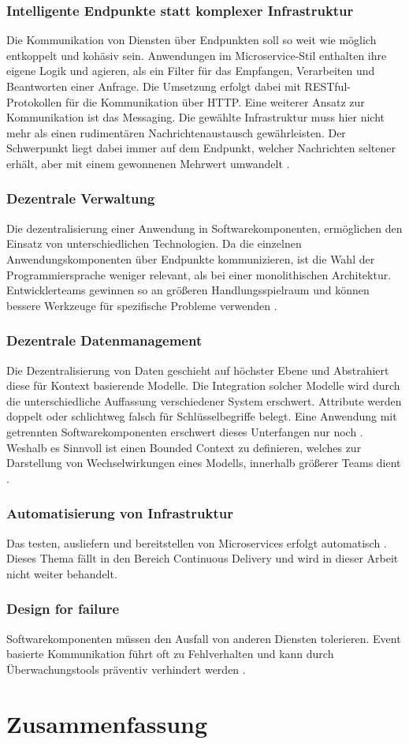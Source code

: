 \subsubsection{Intelligente Endpunkte statt komplexer Infrastruktur}
Die Kommunikation von Diensten über Endpunkten soll so weit wie möglich entkoppelt und kohäsiv sein.  
Anwendungen im Microservice-Stil enthalten ihre eigene Logik und agieren, als ein Filter für das Empfangen, Verarbeiten und Beantworten einer Anfrage. 
Die Umsetzung erfolgt dabei mit RESTful-Protokollen für die Kommunikation über HTTP. 
Eine weiterer Ansatz zur Kommunikation ist das Messaging.
Die gewählte Infrastruktur muss hier nicht mehr als einen rudimentären Nachrichtenaustausch gewährleisten. 
Der Schwerpunkt liegt dabei immer auf dem Endpunkt, welcher Nachrichten seltener erhält, aber mit einem gewonnenen Mehrwert umwandelt \cite{FowlerMicroservice}.

\subsubsection{Dezentrale Verwaltung}
Die dezentralisierung einer Anwendung in Softwarekomponenten, ermöglichen den Einsatz von unterschiedlichen Technologien. 
Da die einzelnen Anwendungskomponenten über Endpunkte kommunizieren, ist die Wahl der Programmiersprache weniger relevant, als bei einer monolithischen Architektur. 
Entwicklerteams gewinnen so an größeren Handlungsspielraum und können bessere Werkzeuge für spezifische Probleme verwenden \cite{FowlerMicroservice}.

\subsubsection{Dezentrale Datenmanagement}
Die Dezentralisierung von Daten geschieht auf höchster Ebene und Abstrahiert diese für Kontext basierende Modelle. 
Die Integration solcher Modelle wird durch die unterschiedliche Auffassung verschiedener System erschwert. 
Attribute werden doppelt oder schlichtweg falsch für Schlüsselbegriffe belegt. 
Eine Anwendung mit getrennten Softwarekomponenten erschwert dieses Unterfangen nur noch \cite{FowlerMicroservice}. 
Weshalb es Sinnvoll ist einen \glqq Bounded Context\grqq{} zu definieren, welches zur Darstellung von Wechselwirkungen eines Modells, innerhalb größerer Teams dient \cite{FowlerBoundedContext}. 

\subsubsection{Automatisierung von Infrastruktur}
Das testen, ausliefern und bereitstellen von Microservices erfolgt automatisch \cite{FowlerMicroservice}. 
Dieses Thema fällt in den Bereich Continuous Delivery und wird in dieser Arbeit nicht weiter behandelt. 

\subsubsection{\glqq Design for failure \grqq{}}
Softwarekomponenten müssen den Ausfall von anderen Diensten tolerieren. 
Event basierte Kommunikation führt oft zu Fehlverhalten und kann durch Überwachungstools präventiv verhindert werden \cite{FowlerMicroservice}. 

\section{Zusammenfassung}
